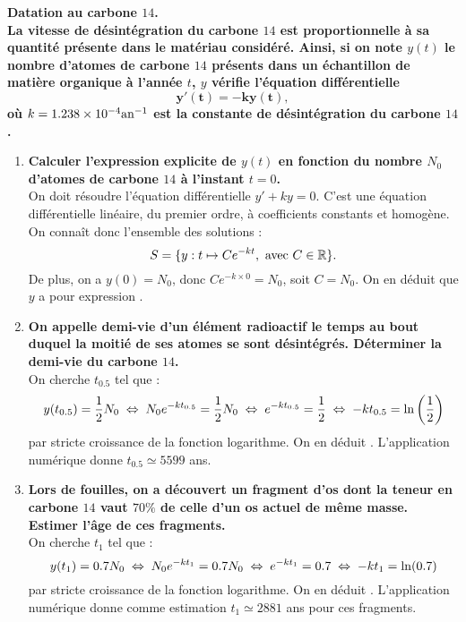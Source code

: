 \documentclass[a4paper, 11pt,reqno]{article}
\begin{document}
\begin{correction} \; \textbf{Datation au carbone $14$.}\\
  \textbf{La vitesse de d\'esint\'egration du carbone $14$ est proportionnelle \`a sa quantit\'e pr\'esente dans le mat\'eriau consid\'er\'e. Ainsi, si on note $y(t)$ le nombre d'atomes de carbone $14$ pr\'esents dans un \'echantillon de mati\`ere organique \`a l'ann\'ee $t$, $y$ v\'erifie l'\'equation diff\'erentielle}
  $$\mathbf{y'(t) = -k y(t),}$$
  \textbf{o\`u $k=1.238 \times 10^{-4} \textmd{an}^{-1}$ est la constante de d\'esint\'egration du carbone $14$.}
  \begin{enumerate}
    \item \textbf{Calculer l'expression explicite de $y(t)$ en fonction du nombre $N_0$ d'atomes de carbone $14$ \`a l'instant $t=0$.}\\
          On doit r\'esoudre l'\'equation diff\'erentielle $y'+ky = 0$.  C'est une \'equation diff\'erentielle lin\'eaire, du premier ordre, \`a coefficients constants et homog\`ene. On conna\^it donc l'ensemble des solutions :
          $$S=\{ y: t \mapsto C e^{-kt}, \textmd{ avec }C \in \mathbb{R}\}.$$
          De plus, on a $y(0) = N_0$, donc $C e^{-k\times 0} = N_0$, soit $C=N_0$. On en d\'eduit que $y$ a pour expression .
    \item \textbf{On appelle demi-vie d'un \'el\'ement radioactif le temps au bout duquel la moiti\'e de ses atomes se sont d\'esint\'egr\'es. D\'eterminer la demi-vie du carbone $14$.}\\
          On cherche $t_{0.5}$ tel que :
          $$y(t_{0.5}) = \displaystyle \frac{1}{2} N_0 \; \Leftrightarrow \; N_0 e^{-kt_{0.5}} = \frac{1}{2} N_0 \; \Leftrightarrow \; e^{-kt_{0.5}} = \frac{1}{2} \; \Leftrightarrow \; -kt_{0.5} = \ln\left(\frac{1}{2}\right)$$
          par stricte croissance de la fonction logarithme. On en d\'eduit . L'application num\'erique donne $t_{0.5} \simeq 5599$ ans.
    \item \textbf{Lors de fouilles, on a d\'ecouvert un fragment d'os dont la teneur en carbone $14$ vaut $70\%$ de celle d'un os actuel de m\^eme masse. Estimer l'\^age de ces fragments.}\\
          On cherche $t_1$ tel que :
          $$y(t_{1}) = \displaystyle 0.7 N_0 \; \Leftrightarrow \; N_0 e^{-kt_{1}} = 0.7 N_0 \; \Leftrightarrow \; e^{-kt_{1}} = 0.7 \; \Leftrightarrow \; -kt_{1} = \ln(0.7)$$
          par stricte croissance de la fonction logarithme. On en d\'eduit . L'application num\'erique donne comme estimation $t_{1} \simeq 2881$ ans pour ces fragments.
  \end{enumerate}
\end{correction}
\end{document}
